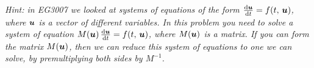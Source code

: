 \vspace{0.6cm}

\textit{Hint: in EG3007 we looked at systems of equations of the form $\frac{\mathrm{d} \boldsymbol{ u }}{\mathrm{d} t} = f\!\left( t,\,\boldsymbol{ u } \right)$, where $\boldsymbol{ u }$ is a vector of different variables. In this problem you need to solve a system of equation $M\!\left( \boldsymbol{ u } \right) \frac{\mathrm{d} \boldsymbol{ u }}{\mathrm{d} t} = f\!\left( t,\,\boldsymbol{ u } \right)$, where $M\!\left( \boldsymbol{ u } \right)$ is a matrix. If you can form the matrix $M\!\left( \boldsymbol{ u } \right)$, then we can reduce this system of equations to one we can solve, by premultiplying both sides by $M^{-1}$.}
%
